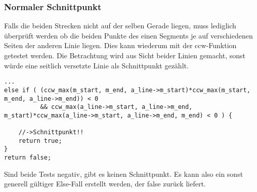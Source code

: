 \subsubsection{Normaler Schnittpunkt}
Falls die beiden Strecken nicht auf der selben Gerade liegen, muss lediglich überprüft werden ob die beiden Punkte des einen Segments je auf verschiedenen Seiten der anderen Linie liegen. Dies kann wiederum mit der ccw-Funktion getestet werden. Die Betrachtung wird aus Sicht beider Linien gemacht, sonst würde eine seitlich versetzte Linie als Schnittpunkt gezählt.

\begin{lstlisting}[captionpos=b, caption={Schnittpr\"ufung mit ccw-Funktion}, label=A1:Schnittpunkt]
...
else if ( (ccw_max(m_start, m_end, a_line->m_start)*ccw_max(m_start, m_end, a_line->m_end)) < 0
		  && ccw_max(a_line->m_start, a_line->m_end, m_start)*ccw_max(a_line->m_start, a_line->m_end, m_end) < 0 ) {

	//->Schnittpunkt!!
	return true;
}
return false;
\end{lstlisting}
 
Sind beide Tests negativ, gibt es keinen Schnittpunkt. Es kann also ein sonst generell gültiger Else-Fall erstellt werden, der false zurück liefert.


